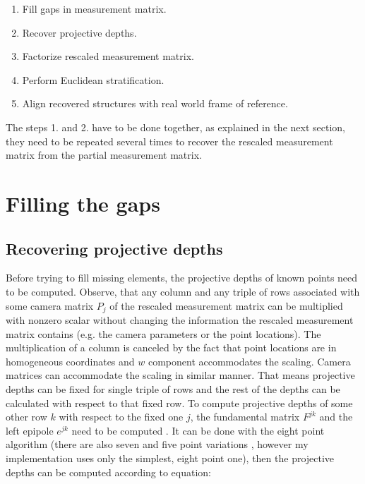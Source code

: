 \documentclass[12pt]{article}
\begin{document}
\begin{enumerate}
\item Fill gaps in measurement matrix.
\item Recover projective depths.
\item Factorize rescaled measurement matrix.
\item Perform Euclidean stratification.
\item Align recovered structures with real world frame of reference.
\end{enumerate}

The steps 1. and 2. have to be done together, as explained in the next section,
they need to be repeated several times to recover the rescaled measurement matrix from
the partial measurement matrix.

\section{Filling the gaps}
\subsection{Recovering projective depths}

Before trying to fill missing elements, the projective depths of known points
need to be computed. Observe, that any column and any triple of rows associated
with some camera matrix  $P_j$ of the rescaled measurement matrix can be
multiplied with nonzero scalar without changing the information the rescaled
measurement matrix contains (e.g. the camera parameters or the point
locations). The multiplication of a column is canceled by the fact that point
locations are in homogeneous coordinates and $w$ component accommodates the
scaling. Camera matrices can accommodate the scaling in similar manner. That
means projective depths can be fixed for single triple of rows and the rest of
the depths can be calculated with respect to that fixed row. To compute
projective depths of some other row $k$ with respect to the fixed one $j$, the
fundamental matrix $F^{jk}$ and the left epipole $e^{jk}$ need to be computed
\cite{sturm96}. It can be done with the eight point algorithm \cite{hartley95}
(there are   also seven and five point variations \cite{stewenius06}, however
my implementation uses only    the simplest, eight point one), then the
projective depths can be computed according to equation:

\end{document}
